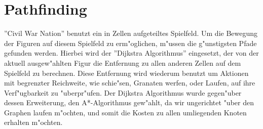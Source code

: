 \chapter{Pathfinding}
''Civil War Nation'' benutzt ein in Zellen aufgeteiltes Spielfeld. Um die Bewegung der Figuren auf diesem Spielfeld zu erm"oglichen, m"ussen die g"unstigsten Pfade gefunden werden. Hierbei wird der ''Dijkstra Algorithmus'' eingesetzt, der von der aktuell ausgew"ahlten Figur die Entfernung zu allen anderen Zellen auf dem Spielfeld zu berechnen. Diese Entfernung wird wiederum benutzt um Aktionen mit begrenzter Reichweite, wie schie"sen, Granaten werfen, oder Laufen, auf ihre Verf"ugbarkeit zu "uberpr"ufen.
Der Dijkstra Algorithmus wurde gegen"uber dessen Erweiterung, den A*-Algorithmus gew"ahlt, da wir ungerichtet "uber den Graphen laufen m"ochten, und somit die Kosten zu allen umliegenden Knoten erhalten m"ochten.